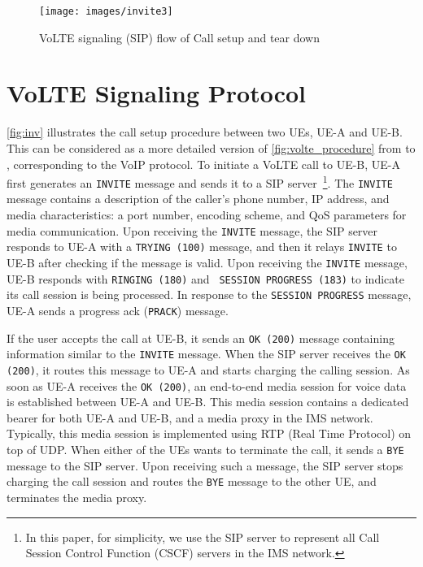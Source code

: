 \begin{figure}[h]
  \centering
  \texttt{[image: images/invite3]}
  \caption{
    VoLTE signaling (SIP) flow of Call setup and tear down
  }
  \label{fig:inv}
\end{figure}


\section{VoLTE Signaling Protocol}
\label{sec:signal_protocol}


\autoref{fig:inv} illustrates the call setup procedure between two
UEs, UE-A and UE-B. This can be considered as a more detailed version
of \autoref{fig:volte_procedure} from  to , corresponding to the 
VoIP protocol. To initiate a VoLTE call to UE-B,
UE-A first generates an {\tt INVITE} message and sends it to a SIP
server~\footnote{In this paper, for simplicity, we use the SIP server to represent all
  Call Session Control Function (CSCF) servers in the IMS network.}. The {\tt INVITE} message contains a description of
the caller's phone number, IP address, and media characteristics: a
port number, encoding scheme, and QoS parameters for media
communication. Upon receiving the {\tt INVITE} message, the SIP server responds to
UE-A with a {\tt TRYING (100)} message, and then it relays {\tt INVITE} to
UE-B after checking if the message is valid. Upon receiving the
{\tt INVITE} message, UE-B responds with {\tt RINGING (180)} and {\tt
  SESSION PROGRESS (183)} to indicate its call session is being
processed. In response to the {\tt SESSION PROGRESS} message, UE-A
sends a progress ack ({\tt PRACK}) message.

If the user accepts the call at UE-B, it sends an {\tt OK (200)}
message containing information similar to the {\tt INVITE}
message. When the SIP server receives the {\tt OK (200)}, it routes this message to UE-A
and starts charging the calling session. As soon as UE-A receives the {\tt OK (200)},
an end-to-end media session for voice data is established between UE-A
and UE-B. This media session contains a dedicated bearer for both UE-A
and UE-B, and a media proxy in the IMS network. Typically, this media
session is implemented using RTP (Real Time Protocol) on top of
UDP. When either of the UEs wants to terminate the call, it sends a {\tt BYE}
message to the SIP server. Upon receiving such a message, the SIP server stops charging the
call session and routes the {\tt BYE} message to the other UE, and terminates the
media proxy.


